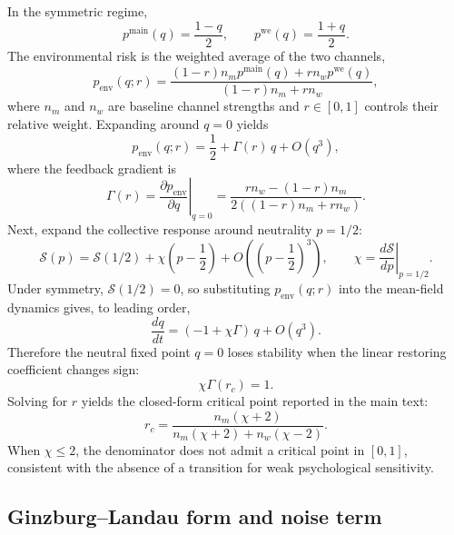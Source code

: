 \documentclass[11pt]{article}
\begin{document}
In the symmetric regime,
\begin{equation}
p^{\text{main}}(q)=\frac{1-q}{2},\qquad p^{\text{we}}(q)=\frac{1+q}{2}.
\end{equation}
The environmental risk is the weighted average of the two channels,
\begin{equation}
p_{\text{env}}(q;r)=\frac{(1-r)n_m p^{\text{main}}(q)+r n_w p^{\text{we}}(q)}{(1-r)n_m+r n_w},
\end{equation}
where $n_m$ and $n_w$ are baseline channel strengths and $r\in[0,1]$ controls their relative weight. Expanding around $q=0$ yields
\begin{equation}
p_{\text{env}}(q;r)=\frac{1}{2}+\Gamma(r)\,q+O(q^3),
\end{equation}
where the feedback gradient is
\begin{equation}
\Gamma(r)=\left.\frac{\partial p_{\text{env}}}{\partial q}\right|_{q=0}
=\frac{r n_w-(1-r)n_m}{2\left((1-r)n_m+r n_w\right)}.
\end{equation}
Next, expand the collective response around neutrality $p=1/2$:
\begin{equation}
\mathcal{S}(p)=\mathcal{S}(1/2)+\chi\left(p-\frac{1}{2}\right)+O\!\left(\left(p-\frac{1}{2}\right)^3\right),\qquad
\chi=\left.\frac{d\mathcal{S}}{dp}\right|_{p=1/2}.
\end{equation}
Under symmetry, $\mathcal{S}(1/2)=0$, so substituting $p_{\text{env}}(q;r)$ into the mean-field dynamics gives, to leading order,
\begin{equation}
\frac{dq}{dt}=(-1+\chi\Gamma)\,q+O(q^3).
\end{equation}
Therefore the neutral fixed point $q=0$ loses stability when the linear restoring coefficient changes sign:
\begin{equation}
\chi\Gamma(r_c)=1.
\end{equation}
Solving for $r$ yields the closed-form critical point reported in the main text:
\begin{equation}
r_c=\frac{n_m(\chi+2)}{n_m(\chi+2)+n_w(\chi-2)}.
\end{equation}
When $\chi\le 2$, the denominator does not admit a critical point in $[0,1]$, consistent with the absence of a transition for weak psychological sensitivity.

\subsection{Ginzburg--Landau form and noise term}
\end{document}

